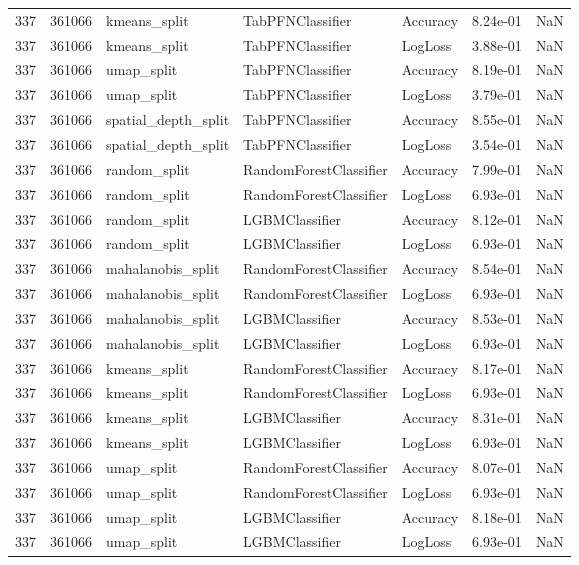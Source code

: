 \begin{tabular}{rrlllrr}
337 & 361066 & kmeans\_split & TabPFNClassifier & Accuracy & 8.24e-01 & NaN \\
337 & 361066 & kmeans\_split & TabPFNClassifier & LogLoss & 3.88e-01 & NaN \\
337 & 361066 & umap\_split & TabPFNClassifier & Accuracy & 8.19e-01 & NaN \\
337 & 361066 & umap\_split & TabPFNClassifier & LogLoss & 3.79e-01 & NaN \\
337 & 361066 & spatial\_depth\_split & TabPFNClassifier & Accuracy & 8.55e-01 & NaN \\
337 & 361066 & spatial\_depth\_split & TabPFNClassifier & LogLoss & 3.54e-01 & NaN \\
337 & 361066 & random\_split & RandomForestClassifier & Accuracy & 7.99e-01 & NaN \\
337 & 361066 & random\_split & RandomForestClassifier & LogLoss & 6.93e-01 & NaN \\
337 & 361066 & random\_split & LGBMClassifier & Accuracy & 8.12e-01 & NaN \\
337 & 361066 & random\_split & LGBMClassifier & LogLoss & 6.93e-01 & NaN \\
337 & 361066 & mahalanobis\_split & RandomForestClassifier & Accuracy & 8.54e-01 & NaN \\
337 & 361066 & mahalanobis\_split & RandomForestClassifier & LogLoss & 6.93e-01 & NaN \\
337 & 361066 & mahalanobis\_split & LGBMClassifier & Accuracy & 8.53e-01 & NaN \\
337 & 361066 & mahalanobis\_split & LGBMClassifier & LogLoss & 6.93e-01 & NaN \\
337 & 361066 & kmeans\_split & RandomForestClassifier & Accuracy & 8.17e-01 & NaN \\
337 & 361066 & kmeans\_split & RandomForestClassifier & LogLoss & 6.93e-01 & NaN \\
337 & 361066 & kmeans\_split & LGBMClassifier & Accuracy & 8.31e-01 & NaN \\
337 & 361066 & kmeans\_split & LGBMClassifier & LogLoss & 6.93e-01 & NaN \\
337 & 361066 & umap\_split & RandomForestClassifier & Accuracy & 8.07e-01 & NaN \\
337 & 361066 & umap\_split & RandomForestClassifier & LogLoss & 6.93e-01 & NaN \\
337 & 361066 & umap\_split & LGBMClassifier & Accuracy & 8.18e-01 & NaN \\
337 & 361066 & umap\_split & LGBMClassifier & LogLoss & 6.93e-01 & NaN \\

\end{tabular}
